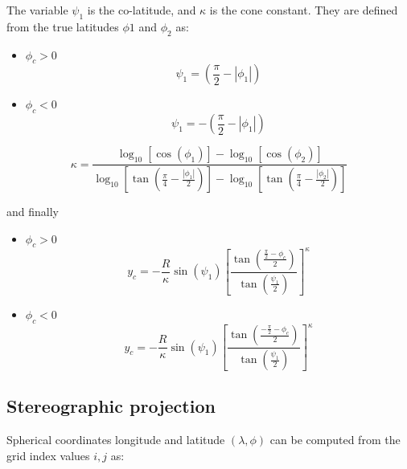 The variable $\psi_1$ is the co-latitude, and $\kappa$ is the cone constant.
They are defined from the true latitudes $\phi1$ and $\phi_2$ as:

\begin{itemize}
  \item $\phi_c > 0$
    \begin{equation}
      \psi_1 = \left(\frac{\pi}{2} - |\phi_1| \right)
    \end{equation}
  \item $\phi_c < 0$
    \begin{equation}
      \psi_1 = -\left(\frac{\pi}{2} - |\phi_1| \right)
    \end{equation}
\end{itemize}

\begin{equation}
  \kappa = \frac{\log_{10}\left[\cos(\phi_1)\right] - 
                 \log_{10}\left[\cos(\phi_2)\right]}
                {\log_{10}\left[\tan(\frac{\pi}{4}-\frac{|\phi_1|}{2})\right]-
                 \log_{10}\left[\tan(\frac{\pi}{4}-\frac{|\phi_2|}{2})\right]}
\end{equation}

and finally

\begin{itemize}
  \item $\phi_c > 0$
    \begin{equation}
      y_c = -\frac{R}{\kappa} \sin(\psi_1) \left[\frac{\tan\left(
          \frac{\frac{\pi}{2}-\phi_c}{2}\right)}
          {\tan\left(\frac{\psi_1}{2}\right)} \right]^\kappa
    \end{equation}
  \item $\phi_c < 0$
    \begin{equation}
      y_c = -\frac{R}{\kappa} \sin(\psi_1) \left[\frac{\tan\left(
          \frac{-\frac{\pi}{2}-\phi_c}{2}\right)}
          {\tan\left(\frac{\psi_1}{2}\right)} \right]^\kappa
    \end{equation}
\end{itemize}

\subsection{Stereographic projection}

Spherical coordinates longitude and latitude $(\lambda, \phi)$ can be computed
from the grid index values $i,j$ as:

